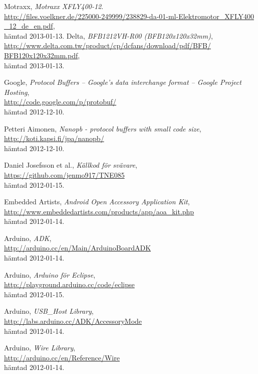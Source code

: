 \begin{thebibliography}{9}
Motraxx,
\emph{Motraxx XFLY400-12}. \\
\url{http://files.voelkner.de/225000-249999/238829-da-01-ml-Elektromotor_XFLY400
_12_de_en.pdf},
\\ hämtad 2013-01-13.
Delta,
\emph{BFB1212VH-R00 (BFB120x120x32mm)},\\
\url{http://www.delta.com.tw/product/cp/dcfans/download/pdf/BFB/
BFB120x120x32mm.pdf},
\\ hämtad 2013-01-13.

Google,
\emph{Protocol Buffers – Google's data interchange format – Google Project
Hosting}, \\
\url{http://code.google.com/p/protobuf/} \\
hämtad 2012-12-10.

Petteri Aimonen,
\emph{Nanopb - protocol buffers with small code size}, \\
\url{http://koti.kapsi.fi/jpa/nanopb/} \\
hämtad 2012-12-10.

Daniel Josefsson et al.,
\emph{Källkod för svävare}, \\
\url{https://github.com/jenmo917/TNE085} \\
hämtad 2012-01-15.

Embedded Artists,
\emph{Android Open Accessory Application Kit}, \\
\url{http://www.embeddedartists.com/products/app/aoa_kit.php} \\
hämtad 2012-01-14.

Arduino,
\emph{ADK}, \\
\url{http://arduino.cc/en/Main/ArduinoBoardADK} \\
hämtad 2012-01-14.

Arduino,
\emph{Arduino för Eclipse}, \\
\url{http://playground.arduino.cc/code/eclipse} \\
hämtad 2012-01-15.

Arduino,
\emph{USB\_Host Library}, \\
\url{http://labs.arduino.cc/ADK/AccessoryMode} \\
hämtad 2012-01-14.

Arduino,
\emph{Wire Library}, \\
\url{http://arduino.cc/en/Reference/Wire} \\
hämtad 2012-01-14.


\end{thebibliography}
